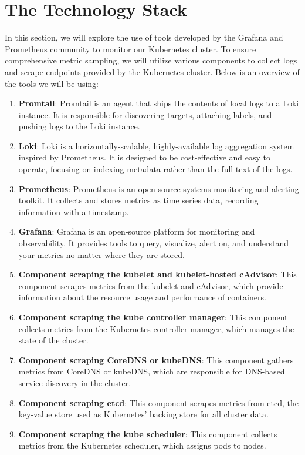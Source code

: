 \section{The Technology Stack}\label{sec:monitoring_stack}
In this section, we will explore the use of tools developed by the Grafana and Prometheus community to monitor our Kubernetes cluster. To ensure comprehensive metric sampling, we will utilize various components to collect logs and scrape endpoints provided by the Kubernetes cluster. Below is an overview of the tools we will be using:

\begin{enumerate}
    \item \textbf{Promtail}: Promtail is an agent that ships the contents of local logs to a Loki instance. It is responsible for discovering targets, attaching labels, and pushing logs to the Loki instance.
    \item \textbf{Loki}: Loki is a horizontally-scalable, highly-available log aggregation system inspired by Prometheus. It is designed to be cost-effective and easy to operate, focusing on indexing metadata rather than the full text of the logs.
    \item \textbf{Prometheus}: Prometheus is an open-source systems monitoring and alerting toolkit. It collects and stores metrics as time series data, recording information with a timestamp.
    \item \textbf{Grafana}: Grafana is an open-source platform for monitoring and observability. It provides tools to query, visualize, alert on, and understand your metrics no matter where they are stored.
    \item \textbf{Component scraping the kubelet and kubelet-hosted cAdvisor}: This component scrapes metrics from the kubelet and cAdvisor, which provide information about the resource usage and performance of containers.
    \item \textbf{Component scraping the kube controller manager}: This component collects metrics from the Kubernetes controller manager, which manages the state of the cluster.
    \item \textbf{Component scraping CoreDNS or kubeDNS}: This component gathers metrics from CoreDNS or kubeDNS, which are responsible for DNS-based service discovery in the cluster.
    \item \textbf{Component scraping etcd}: This component scrapes metrics from etcd, the key-value store used as Kubernetes' backing store for all cluster data.
    \item \textbf{Component scraping the kube scheduler}: This component collects metrics from the Kubernetes scheduler, which assigns pods to nodes.

\end{enumerate}
